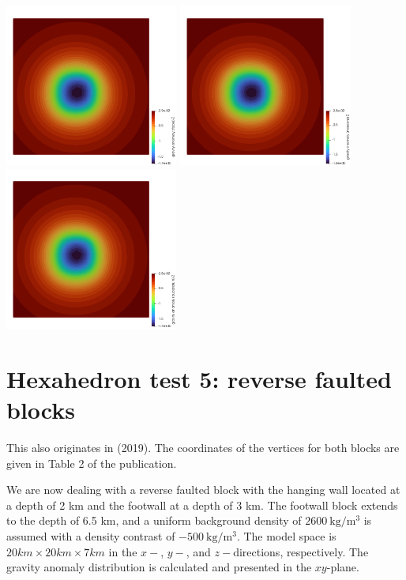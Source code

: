 \begin{center}
\includegraphics[width=5.7cm]{python_codes/fieldstone_113/results/hex_test4/g_faces}
\includegraphics[width=5.7cm]{python_codes/fieldstone_113/results/hex_test4/g_mascons}
\includegraphics[width=5.7cm]{python_codes/fieldstone_113/results/hex_test4/g_quad}
\end{center}


\section*{Hexahedron test 5: reverse faulted blocks}

This also originates in \textcite{uwms19} (2019). The coordinates of
the vertices for both blocks are given in Table 2 of the publication.

We are now dealing with a reverse faulted block with the
hanging wall located at a depth of 2 km and the footwall at a depth
of 3 km. The footwall block extends to the depth of 6.5 km, and a
uniform background density of $2600~\si{\kg\per\cubic\meter}$ is assumed with a
density contrast of $-500~\si{\kg\per\cubic\meter}$. The model space is 
$20 km \times  20 km \times 7 km$ 
in the $x-$, $y-$, and $z-$directions, respectively. 
The gravity anomaly distribution is calculated and presented in the $xy$-plane.

